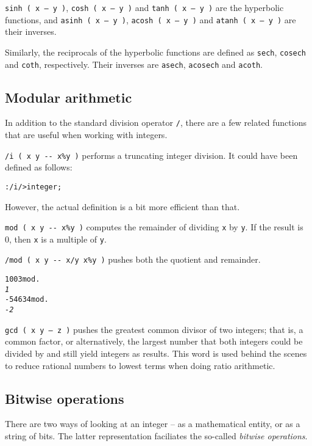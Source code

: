 \documentclass[english]{article}
\begin{document}
\texttt{sinh ( x -- y )}, \texttt{cosh ( x -- y )} and \texttt{tanh ( x -- y )} are the hyperbolic functions, and \texttt{asinh ( x -- y )}, \texttt{acosh ( x -- y )} and \texttt{atanh ( x -- y )} are their inverses.

Similarly, the reciprocals of the hyperbolic functions are defined as \texttt{sech}, \texttt{cosech} and \texttt{coth}, respectively. Their inverses are \texttt{asech}, \texttt{acosech} and \texttt{acoth}.

\subsection{Modular arithmetic}

In addition to the standard division operator \texttt{/}, there are a few related functions that are useful when working with integers.

\texttt{/i ( x y -{}- x\%y )} performs a truncating integer division. It could have been defined as follows:

\begin{alltt}
: /i / >integer ;
\end{alltt}

However, the actual definition is a bit more efficient than that.

\texttt{mod ( x y -{}- x\%y )} computes the remainder of dividing \texttt{x} by \texttt{y}. If the result is 0, then \texttt{x} is a multiple of \texttt{y}.

\texttt{/mod ( x y -{}- x/y x\%y )} pushes both the quotient and remainder.

\begin{alltt}
100 3 mod .
\emph{1}
-546 34 mod .
\emph{-2}
\end{alltt}

\texttt{gcd ( x y -- z )} pushes the greatest common divisor of two integers; that is, a common factor, or alternatively, the largest number that both integers could be divided by and still yield integers as results. This word is used behind the scenes to reduce rational numbers to lowest terms when doing ratio arithmetic.

\subsection{Bitwise operations}

There are two ways of looking at an integer -- as a mathematical entity, or as a string of bits. The latter representation faciliates the so-called \emph{bitwise operations}.
\end{document}
